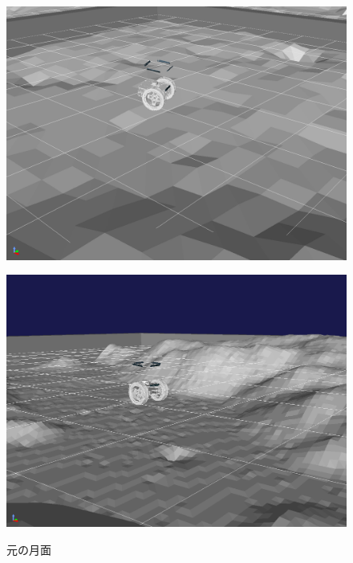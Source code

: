 \documentclass[uplatex,twocolumn, dvipdfmx]{jsarticle}  %
\begin{document}
\begin{figure}[t]
  \centering
  \begin{minipage}[b]{0.49\linewidth}
    \centering
    \includegraphics[keepaspectratio, scale=0.096]{images/origin_moon_field3.png}
    \label{fig:origin_moon_field3}
  \end{minipage}
  \begin{minipage}[b]{0.49\linewidth}
    \centering
    \includegraphics[keepaspectratio, scale=0.096]{images/original_moon_field4.png}
    \label{fig:original_moon_field4}
  \end{minipage}
  \caption{元の月面}
\end{figure}
\end{document}
